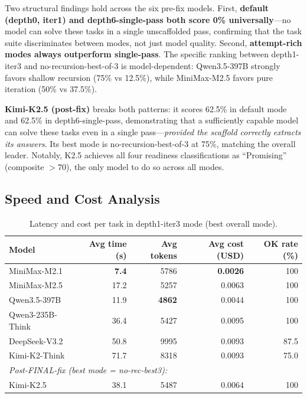 \documentclass[11pt]{article}
\begin{document}
Two structural findings hold across the six pre-fix models. First, \textbf{default (depth0, iter1) and depth6-single-pass both score 0\% universally}---no model can solve these tasks in a single unscaffolded pass, confirming that the task suite discriminates between modes, not just model quality. Second, \textbf{attempt-rich modes always outperform single-pass}. The specific ranking between depth1-iter3 and no-recursion-best-of-3 is model-dependent: Qwen3.5-397B strongly favors shallow recursion (75\% vs 12.5\%), while MiniMax-M2.5 favors pure iteration (50\% vs 37.5\%).

\textbf{Kimi-K2.5 (post-fix)} breaks both patterns: it scores 62.5\% in default mode and 62.5\% in depth6-single-pass, demonstrating that a sufficiently capable model can solve these tasks even in a single pass---\emph{provided the scaffold correctly extracts its answers}. Its best mode is no-recursion-best-of-3 at 75\%, matching the overall leader. Notably, K2.5 achieves all four readiness classifications as ``Promising'' (composite $>70$), the only model to do so across all modes.

\subsection{Speed and Cost Analysis}

\begin{table}[t]
\centering
\caption{Latency and cost per task in depth1-iter3 mode (best overall mode).}
\label{tab:multimodel-speed}
\begin{tabular}{lrrrr}
\toprule
Model & Avg time (s) & Avg tokens & Avg cost (USD) & OK rate (\%) \\
\midrule
MiniMax-M2.1 & \textbf{7.4} & 5786 & \textbf{0.0026} & 100 \\
MiniMax-M2.5 & 17.2 & 5257 & 0.0063 & 100 \\
Qwen3.5-397B & 11.9 & \textbf{4862} & 0.0044 & 100 \\
Qwen3-235B-Think & 36.4 & 5427 & 0.0095 & 100 \\
DeepSeek-V3.2 & 50.8 & 9995 & 0.0093 & 87.5 \\
Kimi-K2-Think & 71.7 & 8318 & 0.0093 & 75.0 \\
\midrule
\multicolumn{5}{l}{\emph{Post-FINAL-fix (best mode = no-rec-best3):}} \\
Kimi-K2.5 & 38.1 & 5487 & 0.0064 & 100 \\
\bottomrule
\end{tabular}
\end{table}
\end{document}
